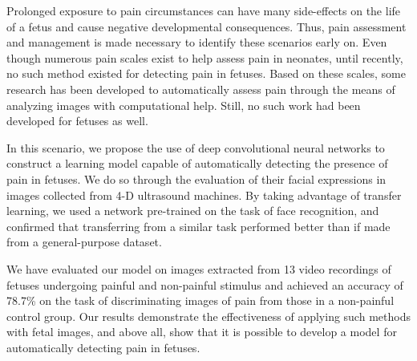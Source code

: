 Prolonged exposure to pain circumstances can have many side-effects on the life of a fetus and cause negative developmental consequences. Thus, pain assessment and management is made necessary to identify these scenarios early on. Even though numerous pain scales exist to help assess pain in neonates, until recently, no such method existed for detecting pain in fetuses. Based on these scales, some research has been developed to automatically assess pain through the means of analyzing images with computational help. Still, no such work had been developed for fetuses as well.

In this scenario, we propose the use of deep convolutional neural networks to construct a learning model capable of automatically detecting the presence of pain in fetuses. We do so through the evaluation of their facial expressions in images collected from 4-D ultrasound machines. By taking advantage of transfer learning, we used a network pre-trained on the task of face recognition, and confirmed that transferring from a similar task performed better than if made from a general-purpose dataset. 

We have evaluated our model on images extracted from 13 video recordings of fetuses undergoing painful and non-painful stimulus and achieved an accuracy of 78.7\% on the task of discriminating images of pain from those in a non-painful control group. Our results demonstrate the effectiveness of applying such methods with fetal images, and above all, show that it is possible to develop a model for automatically detecting pain in fetuses.

